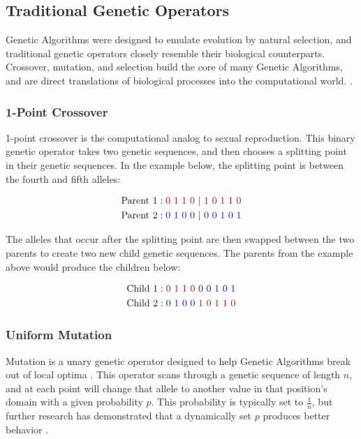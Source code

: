 \subsection*{Traditional Genetic Operators}
Genetic Algorithms were designed to emulate evolution by natural selection, and traditional genetic operators closely resemble their biological counterparts. Crossover, mutation, and selection build the core of many Genetic Algorithms, and are direct translations of biological processes into the computational world. \cite{Russell10}.

\subsubsection*{1-Point Crossover}
1-point crossover is the computational analog to sexual reproduction. This binary genetic operator takes two genetic sequences, and then chooses a splitting point in their genetic sequences. In the example below, the splitting point is between the fourth and fifth alleles:

\begin{align*}
\text{Parent 1} &: {\color{myred}0~1~1~0~}|{\color{myred}~1~0~1~1~0} 			\\
\text{Parent 2} &: {\color{myblue}0~1~0~0~}|{\color{myblue}~0~0~1~0~1} 	\\		
\end{align*}

\noindent The alleles that occur after the splitting point are then swapped between the two parents to create two new child genetic sequences. The parents from the example above would produce the children below:

\begin{align*}
\text{Child 1} &: {\color{myred}0~1~1~0}{\color{myblue}~0~0~1~0~1} 			\\  
\text{Child 2} &: {\color{myblue}0~1~0~0}{\color{myred}~1~0~1~1~0} 		
\end{align*}

\subsubsection*{Uniform Mutation}
Mutation is a unary genetic operator designed to help Genetic Algorithms break out of local optima \cite{Russell10}. This operator scans through a genetic sequence of length $n$, and at each point will change that allele to another value in that position's domain with a given probability $p$. This probability is typically set to $\frac{1}{n}$, but further research has demonstrated that a dynamically set $p$ produces better behavior \cite{Back93}.

